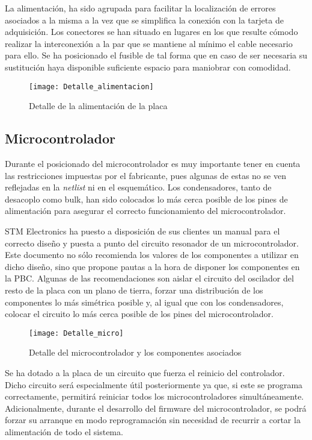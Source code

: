 La alimentación, ha sido agrupada para facilitar la localización de errores asociados a la misma a la vez que se simplifica la conexión con la tarjeta de adquisición. Los conectores se han situado en lugares en los que resulte cómodo realizar la interconexión a la par que se mantiene al mínimo el cable necesario para ello. Se ha posicionado el fusible de tal forma que en caso de ser necesaria su sustitución haya disponible suficiente espacio para maniobrar con comodidad.

\begin{figure} [h]
    \centering
    \texttt{[image: Detalle\_alimentacion]}
    \caption{Detalle de la alimentación de la placa}
    \label{fig:Detalle_alimentacion}
\end{figure}

\subsection{Microcontrolador\label{sec:PCB_micro}}

Durante el posicionado del microcontrolador es muy importante tener en cuenta las restricciones impuestas por el fabricante, pues algunas de estas no se ven reflejadas en la \textit{netlist} ni en el esquemático. Los condensadores, tanto de desacoplo como bulk, han sido colocados lo más cerca posible de los pines de alimentación para asegurar el correcto funcionamiento del microcontrolador.

STM Electronics ha puesto a disposición de sus clientes un manual para el correcto diseño y puesta a punto del circuito resonador de un microcontrolador. Este documento no sólo recomienda los valores de los componentes a utilizar en dicho diseño, sino que propone pautas a la hora de disponer los componentes en la PBC. Algunas de las recomendaciones son aislar el circuito del oscilador del resto de la placa con un plano de tierra, forzar una distribución de los componentes lo más simétrica posible y, al igual que con los condensadores, colocar el circuito lo más cerca posible de los pines del microcontrolador.

\clearpage

\begin{figure} [h]
    \centering
    \texttt{[image: Detalle\_micro]}
    \caption{Detalle del microcontrolador y los componentes asociados}
    \label{fig:Detalle_micro}
\end{figure}

Se ha dotado a la placa de un circuito que fuerza el reinicio del controlador. Dicho circuito será especialmente útil posteriormente ya que, si este se programa correctamente, permitirá reiniciar todos los microcontroladores simultáneamente. Adicionalmente, durante el desarrollo del firmware del microcontrolador, se podrá forzar su arranque en modo reprogramación sin necesidad de recurrir a cortar la alimentación de todo el sistema.

